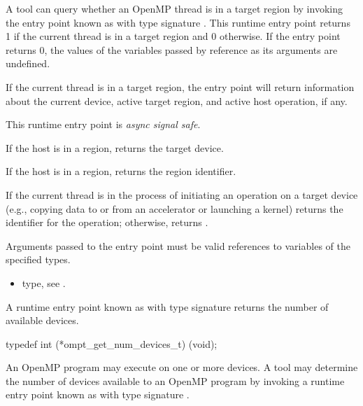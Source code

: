 \descr
A tool can query whether an OpenMP thread is in a target region by
invoking the entry point known as 
with type signature .
This runtime entry point returns 1 if the current thread is
in a target region and 0 otherwise. If the entry point returns 0,
the values of the variables passed by reference as its arguments
are undefined.

If the current thread is in a target region, the entry point will
return information about the current device, active target region, and
active host operation, if any.

This runtime entry point is \emph{async signal safe}.

\argdesc

If the host is in a  region,
 returns the target device.

If the host is in a  region,
 returns the  region identifier.

If the current thread is in the process of initiating an
operation on a target device (e.g., copying data to or from an
accelerator or launching a kernel)  returns
the identifier for the operation; otherwise,
 returns .

\constraints

Arguments passed to the entry point must be valid
references to variables of the specified types.

\crossreferences
\begin{itemize}
\item {} type, see .
\end{itemize}

\label{sec:ompt_get_num_devices_t}
\label{sec:ompt_get_num_devices}

\summary
A runtime entry point known as 
with type signature 
returns the number of available devices.

\format
\begin{ccppspecific}
\begin{omptInquiry}
typedef int (*ompt_get_num_devices_t) (void);
\end{omptInquiry}
\end{ccppspecific}

\descr

An OpenMP program may execute on one or more devices.
A tool may determine the number of devices available to an OpenMP
program by invoking a runtime entry point
known as 
with type signature .

